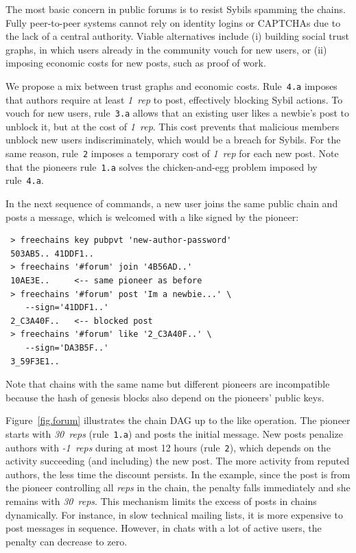 \documentclass[10pt,journal,compsoc]{IEEEtran}
\newcommand{\reps}     {\emph{reps}\xspace}
\newcommand{\onerep}   {\emph{1~rep}\xspace}
\newcommand{\nreps}[1] {\emph{#1~reps\xspace}}
\begin{document}
The most basic concern in public forums is to resist Sybils spamming the
chains.
Fully peer-to-peer systems cannot rely on identity logins or CAPTCHAs due
to the lack of a central authority.
Viable alternatives include (i) building social trust graphs, in which users
already in the community vouch for new users, or (ii) imposing economic costs
for new posts, such as proof of work.

We propose a mix between trust graphs and economic costs.
%
Rule~\texttt{4.a} imposes that authors require at least \onerep to post,
effectively blocking Sybil actions.
To vouch for new users, rule~\texttt{3.a} allows that an existing user likes a
newbie's post to unblock it, but at the cost of \onerep.
This cost prevents that malicious members unblock new users indiscriminately,
which would be a breach for Sybils.
For the same reason, rule~\texttt{2} imposes a temporary cost of \onerep for
each new post.
%
Note that the pioneers rule~\texttt{1.a} solves the chicken-and-egg problem
imposed by rule~\texttt{4.a}.

In the next sequence of commands, a new user joins the same public chain and
posts a message, which is welcomed with a like signed by the pioneer:

{\footnotesize
\begin{verbatim}
 > freechains key pubpvt 'new-author-password'
 503AB5.. 41DDF1..
 > freechains '#forum' join '4B56AD..'
 10AE3E..     <-- same pioneer as before
 > freechains '#forum' post 'Im a newbie...' \
    --sign='41DDF1..'
 2_C3A40F..   <-- blocked post
 > freechains '#forum' like '2_C3A40F..' \
    --sign='DA3B5F..'
 3_59F3E1..
\end{verbatim}
}

Note that chains with the same name but different pioneers are incompatible
because the hash of genesis blocks also depend on the pioneers' public keys.

Figure~\ref{fig.forum} illustrates the chain DAG up to the like operation.
The pioneer starts with \nreps{30} (rule~\texttt{1.a}) and posts the initial
message.
%
New posts penalize authors with \nreps{-1} during at most 12 hours
(rule~\texttt{2}), which depends on the activity succeeding (and including) the
new post.
The more activity from reputed authors, the less time the discount persists.
In the example, since the post is from the pioneer controlling all \reps in the
chain, the penalty falls immediately and she remains with \nreps{30}.
This mechanism limits the excess of posts in chains dynamically.
For instance, in slow technical mailing lists, it is more expensive to post
messages in sequence.
However, in chats with a lot of active users, the penalty can decrease to zero.
\end{document}
